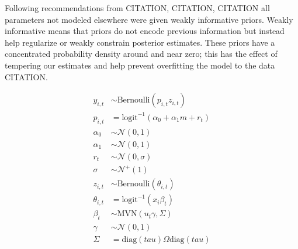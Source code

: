 \documentclass[12pt,letterpaper]{article}
\begin{document}
Following recommendations from CITATION, CITATION, CITATION all parameters not modeled elsewhere were given weakly informative priors. Weakly informative means that priors do not encode previous information but instead help regularize or weakly constrain posterior estimates. These priors have a concentrated probability density around and near zero; this has the effect of tempering our estimates and help prevent overfitting the model to the data CITATION. 

\begin{equation}
  \begin{aligned}
    y_{i, t} &\sim \text{Bernoulli}(p_{i, t} z_{i, t}) \\
    p_{i, t} &= \text{logit}^{-1}(\alpha_{0} + \alpha_{1} m + r_{t}) \\ 
    \alpha_{0} &\sim \mathcal{N}(0, 1) \\
    \alpha_{1} &\sim \mathcal{N}(0, 1) \\
    r_{t} &\sim \mathcal{N}(0, \sigma) \\
    \sigma &\sim \mathcal{N}^{+}(1) \\
    z_{i, t} &\sim \text{Bernoulli}(\theta_{i, t}) \\
    \theta_{i, t} &= \text{logit}^{-1}(x_{i} \beta_{t}) \\
    \beta_{t} &\sim \text{MVN}(u_{t} \gamma, \Sigma) \\
    \gamma &\sim \mathcal{N}(0, 1) \\
    \Sigma &= \text{diag}(tau) \Omega \text{diag}(tau) \\
  \end{aligned}
  \label{eq:full}
\end{equation}


\end{document}
